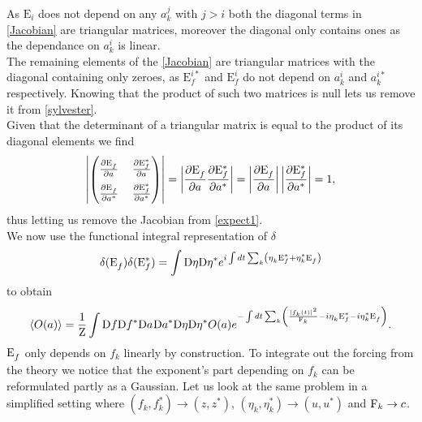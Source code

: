 As $\mathrm{E}_i$ does not depend on any $a_k^{j}$ with $j > i$ both the diagonal terms in \eqref{Jacobian} are triangular matrices, moreover the diagonal only contains 
ones as the dependance on $a_k^{i}$ is linear. \\
The remaining elements of the \eqref{Jacobian} are triangular matrices with the diagonal containing only zeroes, as
$\mathrm{E}_f^{i*}$ and  $\mathrm{E}_f^{i}$ do not depend on $a_k^{i}$  and $a_k^{i*}$ respectively. Knowing that the product of such two matrices is null lets us remove it 
from \eqref{sylvester}. \\
Given that the determinant of a triangular matrix is equal to the product of its diagonal elements we find 
\begin{equation}
    \renewcommand{\arraystretch}{1.8}  %
    \setlength{\arraycolsep}{6pt}     %
    \left|
    \begin{pmatrix}
        \frac{\partial \Ef}{\partial \anorm}  & \frac{\partial \Efstar}{\partial \anorm} \\
        \frac{\partial \Ef}{\partial \astar}  & \frac{\partial \Efstar}{\partial \astar}
    \end{pmatrix}
    \right|
    = \left| \frac{\partial \Ef}{\partial \anorm} \frac{\partial \Efstar}{\partial \astar}\right|
    = \left| \frac{\partial \Ef}{\partial \anorm} \right| \left|\frac{\partial \Efstar}{\partial \astar}\right|
    = 1,
\end{equation} 
thus letting us remove the Jacobian from \eqref{expect1}.\\
We now use the functional integral representation of $\delta$
\begin{equation}
    \delta(\mathrm{E}_f^{})\delta(\mathrm{E}_f^*) = \int \mathrm{D} \eta\mathrm{D} \eta^* e^{i\int dt \sum_{k}\left( \eta_k^{}\mathrm{E}_f^* +\eta_k^* \mathrm{E}_f^{}\right)}
\end{equation}
to obtain 
\begin{equation}
    \langle O(a) \rangle = \frac{1}{\mathrm{Z}}\int \mathrm{D} f \mathrm{D} f^* \mathrm{D} a^{} \mathrm{D}a^{*}\mathrm{D} \eta\mathrm{D} \eta^*  O(a)
    e^{-\int dt \sum_k \left( \frac{|f_k(t)|^2}{\mathrm{F}_k} - i\eta_k^{}\mathrm{E}_f^* -i\eta_k^* \mathrm{E}_f^{} \right)}.
    \label{expect2}
\end{equation}
$\mathrm{E}_f^{}$ only depends on $f_k$ linearly by construction. To integrate out the forcing from the theory we notice that the exponent's part depending on $f_k$
can be reformulated partly as a Gaussian. 
Let us look at the same problem in a simplified setting where $(f_k^{},f_k^*)  \rightarrow (z, z^*)$, $(\eta_k^{}, \eta_k^*) \rightarrow (u, u^*)$ and $\mathrm{F}_k \rightarrow c$.
